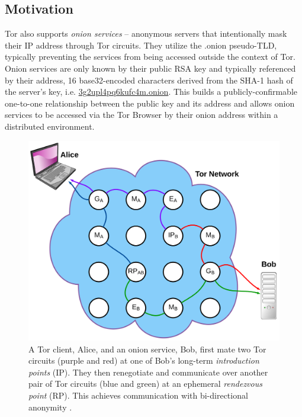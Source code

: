 \documentclass[USenglish,oneside,twocolumn]{article}
\begin{document}
\subsection{Motivation}

Tor also supports \emph{onion services} -- anonymous servers that intentionally mask their IP address through Tor circuits. They utilize the .onion pseudo-TLD, typically preventing the services from being accessed outside the context of Tor. Onion services are only known by their public RSA key and typically referenced by their address, 16 base32-encoded characters derived from the SHA-1 hash of the server's key, i.e. \url{3g2upl4pq6kufc4m.onion}. This builds a publicly-confirmable one-to-one relationship between the public key and its address and allows onion services to be accessed via the Tor Browser by their onion address within a distributed environment.

\begin{figure}[htbp]
	\centering
	\includegraphics[width=0.9\linewidth]{../assets/images/LucidCharts/Hidden_Services.pdf}
	\caption{A Tor client, Alice, and an onion service, Bob, first mate two Tor circuits (purple and red) at one of Bob's long-term \emph{introduction points} (IP). They then renegotiate and communicate over another pair of Tor circuits (blue and green) at an ephemeral \emph{rendezvous point} (RP). This achieves communication with bi-directional anonymity \cite{overlier2006locating}.}
\end{figure}
\end{document}
